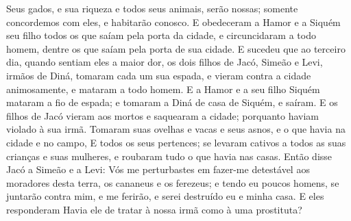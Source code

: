 {{Seus gados, e sua riqueza e todos seus animais, serão nossas; somente concordemos com eles, e habitarão conosco.
E obedeceram a Hamor e a Siquém seu filho todos os que saíam pela porta da cidade, e circuncidaram a todo homem, dentre os que saíam pela porta de sua cidade.
E sucedeu que ao terceiro dia, quando sentiam eles a maior dor, os dois filhos de Jacó, Simeão e Levi, irmãos de Diná, tomaram cada um sua espada, e vieram contra a cidade animosamente, e mataram a todo homem.
E a Hamor e a seu filho Siquém mataram a fio de espada; e tomaram a Diná de casa de Siquém, e saíram.
E os filhos de Jacó vieram aos mortos e saquearam a cidade; porquanto haviam violado à sua irmã.
Tomaram suas ovelhas e vacas e seus asnos, e o que havia na cidade e no campo,
E todos os seus pertences; se levaram cativos a todos as suas crianças e suas mulheres, e roubaram tudo o que havia nas casas.
Então disse Jacó a Simeão e a Levi: Vós me perturbastes em fazer-me detestável aos moradores desta terra, os cananeus e os ferezeus; e tendo eu poucos homens, se juntarão contra mim, e me ferirão, e serei destruído eu e minha casa.
E eles responderam Havia ele de tratar à nossa irmã como à uma prostituta?

\par}

}
